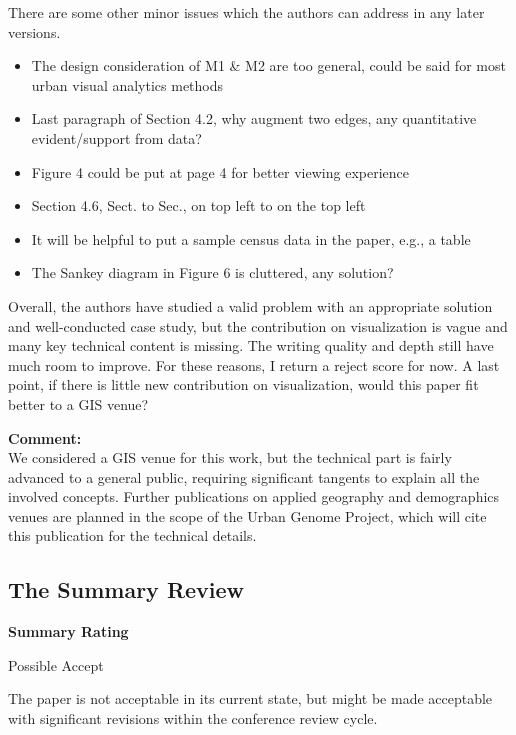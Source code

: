 \documentclass{article}
\newcommand{\reply}[1]{\begin{tcolorbox}\noindent\textbf{Comment:}\\#1\hfill\end{tcolorbox}}
\begin{document}
\begin{itemize}
{    There are some other minor issues which the authors can address in any later
    versions.

    \begin{itemize}
        \item{The design consideration of M1 \& M2 are too general, could be
        said for most urban visual analytics methods}
        \item{Last paragraph of Section 4.2, why augment two edges, any quantitative
        evident/support from data?}
        \item{Figure 4 could be put at page 4 for better viewing experience}
        \item{Section 4.6, Sect. to Sec., on top left to on the top left}
        \item{It will be helpful to put a sample census data in the paper, e.g., a table}
        \item{The Sankey diagram in Figure 6 is cluttered, any solution?}
    \end{itemize}

    Overall, the authors have studied a valid problem with an appropriate
    solution and well-conducted case study, but the contribution on
    visualization is vague and many key technical content is missing. The
    writing quality and depth still have much room to improve. For these
    reasons, I return a reject score for now. A last point, if there is little
    new contribution on visualization, would this paper fit better to a GIS
    venue? 
    
    \reply{We considered a GIS venue for this work, but the technical part is
    fairly advanced to a general public, requiring significant tangents to
    explain all the involved concepts. Further publications on applied geography
    and demographics venues are planned in the scope of the Urban Genome
    Project, which will cite this publication for the technical details.}}

\end{itemize}

\subsection{The Summary Review}

\textbf{Summary Rating}

    Possible Accept
    
    The paper is not acceptable in its current state, but might be made
    acceptable with significant revisions within the conference review cycle.
    
\end{document}
